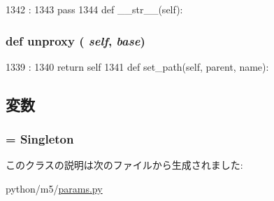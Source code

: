 \begin{DoxyCode}
1342                                     :
1343         pass
1344 
    def __str__(self):
\end{DoxyCode}
\hypertarget{classm5_1_1params_1_1NullSimObject_a587cd3c1e899640dc09d63793aa8093b}{
\subsubsection[{unproxy}]{\setlength{\rightskip}{0pt plus 5cm}def unproxy ( {\em self}, \/   {\em base})}}
\label{classm5_1_1params_1_1NullSimObject_a587cd3c1e899640dc09d63793aa8093b}



\begin{DoxyCode}
1339                            :
1340         return self
1341 
    def set_path(self, parent, name):
\end{DoxyCode}


\subsection{変数}
\hypertarget{classm5_1_1params_1_1NullSimObject_adfc4d1824f4ecdcbb04ceafc5bbc933e}{
\subsubsection[{\_\-\_\-metaclass\_\-\_\-}]{ = {\bf Singleton}}}
\label{classm5_1_1params_1_1NullSimObject_adfc4d1824f4ecdcbb04ceafc5bbc933e}


このクラスの説明は次のファイルから生成されました:\begin{DoxyCompactItemize}
\item 
python/m5/\hyperlink{params_8py}{params.py}\end{DoxyCompactItemize}

